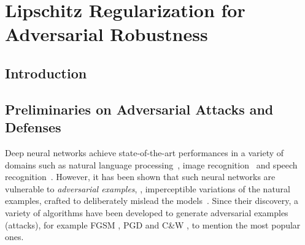 \chapter{Lipschitz Regularization for Adversarial Robustness}
\label{chapter:lipschitz_regularization_for_adversarial_robustness}
\localtableofcontents

\section{Introduction}
\label{section:ch6-introduction}



\section{Preliminaries on Adversarial Attacks and Defenses}
\label{section:ch6-preliminaries_adversarial_attacks_and_defenses}

Deep neural networks achieve state-of-the-art performances in a variety of domains such as natural language processing~\cite{radford2018Language}, image recognition~\cite{he2016deep} and speech recognition~\cite{hinton2012deep}.
However, it has been shown that such neural networks are vulnerable to \emph{adversarial examples}, \ie, imperceptible variations of the natural examples, crafted to deliberately mislead the models~\cite{globerson2006nightmare,biggio2013evasion,szegedy2013intriguing}.
Since their discovery, a variety of algorithms have been developed to generate adversarial examples (\aka attacks), for example FGSM \cite{goodfellow2014explaining}, PGD \cite{madry2018towards} and C\&W \cite{carlini2017towards}, to mention the most popular ones.

